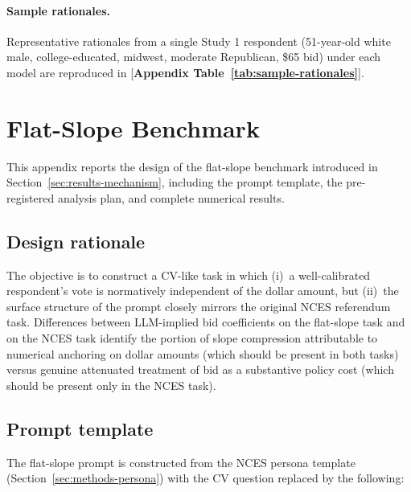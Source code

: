 \documentclass[12pt]{article}
\begin{document}
\paragraph{Sample rationales.} Representative rationales from a single Study 1 respondent (51-year-old white male, college-educated, midwest, moderate Republican, \$65 bid) under each model are reproduced in [\textbf{Appendix Table~\ref{tab:sample-rationales}}].

\section{Flat-Slope Benchmark}\label{app:flat-slope-prompts}

This appendix reports the design of the flat-slope benchmark introduced in Section~\ref{sec:results-mechanism}, including the prompt template, the pre-registered analysis plan, and complete numerical results.

\subsection{Design rationale}

The objective is to construct a CV-like task in which (i)~a well-calibrated respondent's vote is normatively independent of the dollar amount, but (ii)~the surface structure of the prompt closely mirrors the original NCES referendum task. Differences between LLM-implied bid coefficients on the flat-slope task and on the NCES task identify the portion of slope compression attributable to numerical anchoring on dollar amounts (which should be present in both tasks) versus genuine attenuated treatment of bid as a substantive policy cost (which should be present only in the NCES task).

\subsection{Prompt template}

The flat-slope prompt is constructed from the NCES persona template (Section~\ref{sec:methods-persona}) with the CV question replaced by the following:
\end{document}
